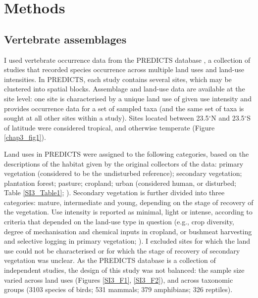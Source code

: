 \section{Methods}

\subsection{Vertebrate assemblages}

I used vertebrate occurrence data from the PREDICTS database \citep{Hudson2014, Hudson2017}, a collection of studies that recorded species occurrence across multiple land uses and land-use intensities. In PREDICTS, each study contains several sites, which may be clustered into spatial blocks. Assemblage and land-use data are available at the site level: one site is characterised by a unique land use of given use intensity and provides occurrence data for a set of sampled taxa (and the same set of taxa is sought at all other sites within a study). Sites located between 23.5$^{\circ}$N and 23.5$^{\circ}$S of latitude were considered tropical, and otherwise temperate (Figure \ref{chap3_fig1}).

Land uses in PREDICTS were assigned to the following categories, based on the descriptions of the habitat given by the original collectors of the data: primary vegetation (considered to be the undisturbed reference); secondary vegetation; plantation forest; pasture; cropland; urban (considered human, or disturbed; Table \ref{SI3_Table1};  \cite{Hudson2014, Hudson2017}). Secondary vegetation is further divided into three categories: mature, intermediate and young, depending on the stage of recovery of the vegetation. Use intensity is reported as minimal, light or intense, according to criteria that depended on the land-use type in question (e.g., crop diversity, degree of mechanisation and chemical inputs in cropland, or bushmeat harvesting and selective logging in primary vegetation; \cite{Hudson2014}). I excluded sites for which the land use could not be characterised or for which the stage of recovery of secondary vegetation was unclear. As the PREDICTS database is a collection of independent studies, the design of this study was not balanced: the sample size varied across land uses (Figures \ref{SI3_F1}, \ref{SI3_F2}), and across taxonomic groups (3103 species of birds; 531 mammals; 379 amphibians; 326 reptiles).

